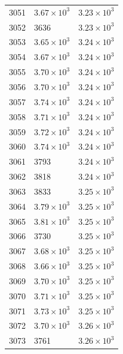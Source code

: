 \begin{table}[H]
\begin{tabular}{lll}
3051 & $\displaystyle 3.67 \times 10^{3}$ & $\displaystyle 3.23 \times 10^{3}$ \\
3052 & 3636 & $\displaystyle 3.23 \times 10^{3}$ \\
3053 & $\displaystyle 3.65 \times 10^{3}$ & $\displaystyle 3.24 \times 10^{3}$ \\
3054 & $\displaystyle 3.67 \times 10^{3}$ & $\displaystyle 3.24 \times 10^{3}$ \\
3055 & $\displaystyle 3.70 \times 10^{3}$ & $\displaystyle 3.24 \times 10^{3}$ \\
3056 & $\displaystyle 3.70 \times 10^{3}$ & $\displaystyle 3.24 \times 10^{3}$ \\
3057 & $\displaystyle 3.74 \times 10^{3}$ & $\displaystyle 3.24 \times 10^{3}$ \\
3058 & $\displaystyle 3.71 \times 10^{3}$ & $\displaystyle 3.24 \times 10^{3}$ \\
3059 & $\displaystyle 3.72 \times 10^{3}$ & $\displaystyle 3.24 \times 10^{3}$ \\
3060 & $\displaystyle 3.74 \times 10^{3}$ & $\displaystyle 3.24 \times 10^{3}$ \\
3061 & 3793 & $\displaystyle 3.24 \times 10^{3}$ \\
3062 & 3818 & $\displaystyle 3.24 \times 10^{3}$ \\
3063 & 3833 & $\displaystyle 3.25 \times 10^{3}$ \\
3064 & $\displaystyle 3.79 \times 10^{3}$ & $\displaystyle 3.25 \times 10^{3}$ \\
3065 & $\displaystyle 3.81 \times 10^{3}$ & $\displaystyle 3.25 \times 10^{3}$ \\
3066 & 3730 & $\displaystyle 3.25 \times 10^{3}$ \\
3067 & $\displaystyle 3.68 \times 10^{3}$ & $\displaystyle 3.25 \times 10^{3}$ \\
3068 & $\displaystyle 3.66 \times 10^{3}$ & $\displaystyle 3.25 \times 10^{3}$ \\
3069 & $\displaystyle 3.70 \times 10^{3}$ & $\displaystyle 3.25 \times 10^{3}$ \\
3070 & $\displaystyle 3.71 \times 10^{3}$ & $\displaystyle 3.25 \times 10^{3}$ \\
3071 & $\displaystyle 3.73 \times 10^{3}$ & $\displaystyle 3.25 \times 10^{3}$ \\
3072 & $\displaystyle 3.70 \times 10^{3}$ & $\displaystyle 3.26 \times 10^{3}$ \\
3073 & 3761 & $\displaystyle 3.26 \times 10^{3}$ \\

\end{tabular}
\end{table}
